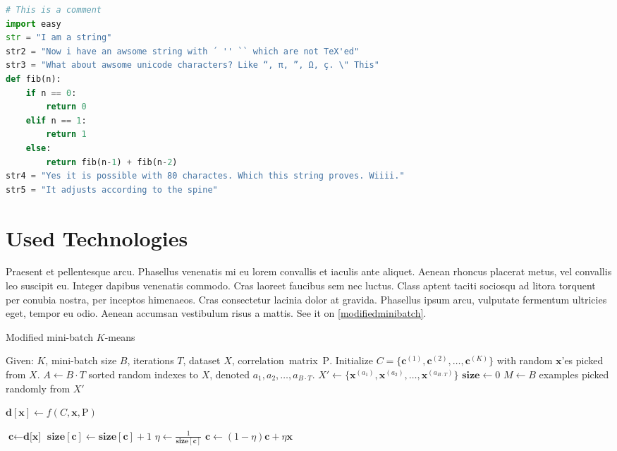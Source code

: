 \begin{adjustwidth*}{0cm}{-0.4cm}
\begin{lstlisting}[language=Python,caption=Fibonacci,label=fibonacci]
# This is a comment
import easy
str = "I am a string"
str2 = "Now i have an awsome string with ´ '' `` which are not TeX'ed"
str3 = "What about awsome unicode characters? Like “, π, ”, Ω, ç. \" This"
def fib(n):
    if n == 0:
        return 0
    elif n == 1:
        return 1
    else:
        return fib(n-1) + fib(n-2)
str4 = "Yes it is possible with 80 charactes. Which this string proves. Wiiii."
str5 = "It adjusts according to the spine"
\end{lstlisting}
\end{adjustwidth*}

\section{Used Technologies}
Praesent et pellentesque arcu. Phasellus venenatis mi eu lorem convallis et iaculis ante aliquet. Aenean rhoncus placerat metus, vel convallis leo suscipit eu. Integer dapibus venenatis commodo. Cras laoreet faucibus sem nec luctus. Class aptent taciti sociosqu ad litora torquent per conubia nostra, per inceptos himenaeos. Cras consectetur lacinia dolor at gravida. Phasellus ipsum arcu, vulputate fermentum ultricies eget, tempor eu odio. Aenean accumsan vestibulum risus a mattis. See it on \cref{modifiedminibatch}.

\begin{algorithm}
\caption{Modified mini-batch $K$-means} \label{modifiedminibatch}
\begin{algorithmic}[1]
\State Given: $K$, mini-batch size $B$, iterations $T$, dataset $X$, correlation~matrix~$\mathrm{P}$.
\State Initialize $C = \{\mathbf{c}^{(1)}, \mathbf{c}^{(2)}, \ldots, \mathbf{c}^{(K)}\}$ with random $\mathbf{x}$'es picked from $X$.
\State $A \gets B \cdot T$ sorted random indexes to $X$, denoted $a_1, a_2, \ldots, a_{B\cdot T}$.
\State $X' \gets \{\mathbf{x}^{(a_1)}, \mathbf{x}^{(a_2)}, \ldots, \mathbf{x}^{(a_{B\cdot T})}\}$ 
\State $\textbf{size} \gets 0$
    \State $M \gets B$ examples picked randomly from $X'$
    
     
        \State $\textbf{d}[\textbf{x}] \gets f(C,\mathbf{x}, \mathrm{P})$ 
    \EndFor
    
     
        \State $\textbf{c} \gets \textbf{d[x]}$ 
        \State $\textbf{size}[\textbf{c}] \gets \textbf{size}[\textbf{c}] + 1$ 
        \State $\eta \gets \frac{1}{\textbf{size}[\textbf{c}]}$       
        \State $\textbf{c} \gets (1 - \eta)\textbf{c}+\eta\textbf{x}$ 
    \EndFor
\EndFor
\State {}
\end{algorithmic}
\end{algorithm}

